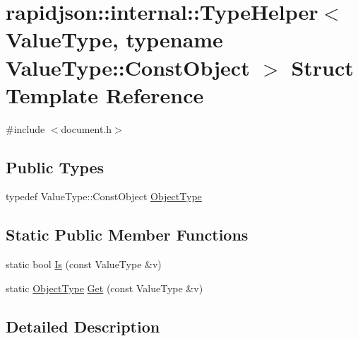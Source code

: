 \hypertarget{structrapidjson_1_1internal_1_1_type_helper_3_01_value_type_00_01typename_01_value_type_1_1_const_object_01_4}{}\section{rapidjson\+::internal\+::Type\+Helper$<$ Value\+Type, typename Value\+Type\+::Const\+Object $>$ Struct Template Reference}
\label{structrapidjson_1_1internal_1_1_type_helper_3_01_value_type_00_01typename_01_value_type_1_1_const_object_01_4}


{\ttfamily \#include $<$document.\+h$>$}

\subsection*{Public Types}
\begin{DoxyCompactItemize}
\item 
typedef Value\+Type\+::\+Const\+Object \mbox{\hyperlink{structrapidjson_1_1internal_1_1_type_helper_3_01_value_type_00_01typename_01_value_type_1_1_const_object_01_4_ac67b73b2732a8ae501a86b01a6cb4544}{Object\+Type}}
\end{DoxyCompactItemize}
\subsection*{Static Public Member Functions}
\begin{DoxyCompactItemize}
\item 
static bool \mbox{\hyperlink{structrapidjson_1_1internal_1_1_type_helper_3_01_value_type_00_01typename_01_value_type_1_1_const_object_01_4_aaf8a8dbaa5a68cf6e6feab57a394ee4f}{Is}} (const Value\+Type \&v)
\item 
static \mbox{\hyperlink{structrapidjson_1_1internal_1_1_type_helper_3_01_value_type_00_01typename_01_value_type_1_1_const_object_01_4_ac67b73b2732a8ae501a86b01a6cb4544}{Object\+Type}} \mbox{\hyperlink{structrapidjson_1_1internal_1_1_type_helper_3_01_value_type_00_01typename_01_value_type_1_1_const_object_01_4_aa073a08fff7f3461c85e127fede9d1c3}{Get}} (const Value\+Type \&v)
\end{DoxyCompactItemize}


\subsection{Detailed Description}
